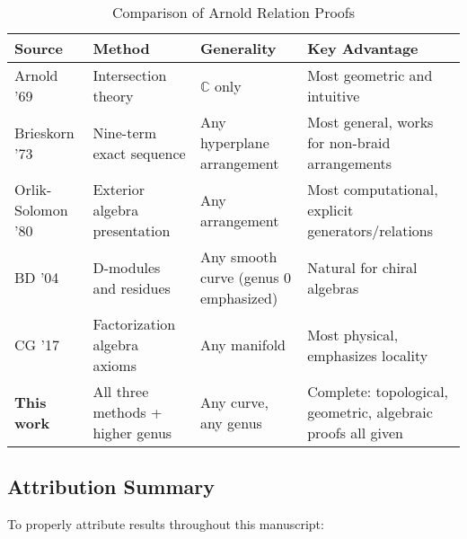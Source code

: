 \begin{table}[H]
\centering
\caption{Comparison of Arnold Relation Proofs}
\begin{tabular}{|l|l|l|p{5cm}|}
\hline
\textbf{Source} & \textbf{Method} & \textbf{Generality} & \textbf{Key Advantage} \\
\hline
\hline
Arnold '69 & 
Intersection theory & 
$\mathbb{C}$ only & 
Most geometric and intuitive \\
\hline
Brieskorn '73 & 
Nine-term exact sequence & 
Any hyperplane arrangement & 
Most general, works for non-braid arrangements \\
\hline
Orlik-Solomon '80 & 
Exterior algebra presentation & 
Any arrangement & 
Most computational, explicit generators/relations \\
\hline
BD '04 & 
D-modules and residues & 
Any smooth curve (genus 0 emphasized) & 
Natural for chiral algebras \\
\hline
CG '17 & 
Factorization algebra axioms & 
Any manifold & 
Most physical, emphasizes locality \\
\hline
\textbf{This work} & 
All three methods + higher genus & 
Any curve, any genus & 
Complete: topological, geometric, algebraic proofs all given \\
\hline
\end{tabular}
\end{table}

\subsection{Attribution Summary}

To properly attribute results throughout this manuscript:

